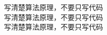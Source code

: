 \begin{frame}[noframenumbering]
\end{frame}
\begin{frame}[noframenumbering]
  \begin{center}
  {\Large 写清楚算法原理，不要只写代码} \\[15pt]
  {\Large 写清楚算法原理，不要只写代码} \\[15pt]
  {\Large 写清楚算法原理，不要只写代码}
  \end{center}
\end{frame}
